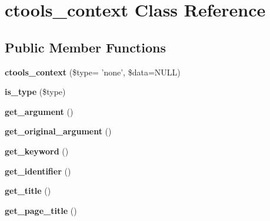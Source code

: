\hypertarget{classctools__context}{
\section{ctools\_\-context Class Reference}
\label{classctools__context}
}
\subsection*{Public Member Functions}
\begin{DoxyCompactItemize}
\item 
\hypertarget{classctools__context_ab39117d29edbeb5330a45c4f6d5c9f55}{
{\bfseries ctools\_\-context} (\$type= 'none', \$data=NULL)}
\label{classctools__context_ab39117d29edbeb5330a45c4f6d5c9f55}

\item 
\hypertarget{classctools__context_a739ea717add87c0624947044008fab6c}{
{\bfseries is\_\-type} (\$type)}
\label{classctools__context_a739ea717add87c0624947044008fab6c}

\item 
\hypertarget{classctools__context_aacd5da48048942731ffc38627bfd7cde}{
{\bfseries get\_\-argument} ()}
\label{classctools__context_aacd5da48048942731ffc38627bfd7cde}

\item 
\hypertarget{classctools__context_ae602badb38e20d9d88542964b8ea63f1}{
{\bfseries get\_\-original\_\-argument} ()}
\label{classctools__context_ae602badb38e20d9d88542964b8ea63f1}

\item 
\hypertarget{classctools__context_a23ee10a21b16dd55058d906058d2624f}{
{\bfseries get\_\-keyword} ()}
\label{classctools__context_a23ee10a21b16dd55058d906058d2624f}

\item 
\hypertarget{classctools__context_ae0bb9aa884633a0cebd23f57cbc5cafa}{
{\bfseries get\_\-identifier} ()}
\label{classctools__context_ae0bb9aa884633a0cebd23f57cbc5cafa}

\item 
\hypertarget{classctools__context_a03be0b2e9bddc828ed8ed23ae4eaa268}{
{\bfseries get\_\-title} ()}
\label{classctools__context_a03be0b2e9bddc828ed8ed23ae4eaa268}

\item 
\hypertarget{classctools__context_a849ebf912bf244d7ad1a9bb20617224c}{
{\bfseries get\_\-page\_\-title} ()}
\label{classctools__context_a849ebf912bf244d7ad1a9bb20617224c}

\end{DoxyCompactItemize}
